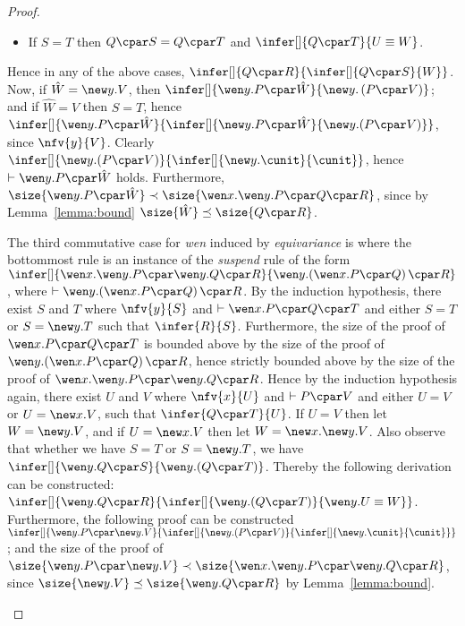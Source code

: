 \begin{proof}
\begin{enumerate}[label=\textbf{\Alph*},ref=\Alph*,leftmargin=*]
{\begin{itemize}
\item If $S = T$ then $Q \cpar S = Q \cpar T$
and $
\infer[]{
Q \cpar T
}{
 U \equiv W
}$.
\end{itemize}
Hence in any of the above cases, $
\infer[]{
Q \cpar R
}{
\infer[]{
 Q \cpar S
}{ W
}}$.
Now, if $\hat{W} = \new y. V$, then $
\infer[]{
\wen y. P \cpar \hat{W}
}{
 \new y. \left(P \cpar V\right)
}$;
and if $\hat{W} = V$ then $S = T$, hence $
\infer[]{
\wen y. P \cpar \hat{W}
}{
\infer[]{
 \new y. P \cpar \hat{W}
}{
 \mathopen{\new y.} \left( P \cpar V\right)
}}$, since $\nfv{y}{V}$.
Clearly $
\infer[]{
\mathopen{\new y.} \left( P \cpar V\right)
}{
\infer[]{
\new y. \cunit
}{
 \cunit
}}
$, hence $\vdash \wen y.P \cpar \hat{W}$ holds.  Furthermore, $\size{\wen y. P \cpar \hat{W}} \prec \size{\wen x. \wen y. P \cpar Q \cpar R}$, since by Lemma~\ref{lemma:bound} $\size{\hat{W}} \preceq \size{ Q \cpar R }$.


The third commutative case for \textit{wen} induced by \textit{equivariance} is where the bottommost rule is an instance of the \textit{suspend} rule of the form 
$
\infer[]{
\wen x. \wen y. P \cpar \wen y. Q \cpar R
}{
\mathopen{\wen y.} \left( \wen x. P \cpar Q \right) \cpar R
}
$, where $\vdash \mathopen{\wen y.} \left( \wen x. P \cpar Q \right) \cpar R$.
By the induction hypothesis, there exist $S$ and $T$ where $\nfv{y}{S}$ and $\vdash \wen x. P \cpar Q \cpar T$ and either $S = T$ or $S = \new y. T$ such that $\infer{R}{S}$.
Furthermore, the size of the proof of $\wen x. P \cpar Q \cpar T$ is bounded above by the size of the proof of $\mathopen{\wen y.} \left( \wen x. P \cpar Q \right) \cpar R$, hence strictly bounded above by the size of the proof of $\wen x. \wen y. P \cpar \wen y. Q \cpar R$.
Hence by the induction hypothesis again, there exist $U$ and $V$ where $\nfv{x}{U}$ and $\vdash P \cpar V$ and either $U = V$ or $U = \new x. V$, such that $\infer{Q \cpar T}{U}$.
If $U = V$ then let $W = \new y. V$, and if $U = \new x. V$ then  let $W = \new x. \new y. V$.
Also observe that whether we have $S = T$ or $S = \new y. T$, we have $
\infer[]{
\wen y. Q \cpar S
}{
\mathopen{\wen y.} \left( Q \cpar T \right)
}$.
Thereby the following derivation can be constructed:
$\infer[]{
\wen y. Q \cpar R
}{
\infer[]{
\mathopen{\wen y.} \left( Q \cpar T \right)
}{
\wen y. U \equiv W
}}$.
Furthermore, the following proof can be constructed $
\infer[]{
\wen y. P \cpar \new y. V
}{
\infer[]{
\mathopen{\new y.} \left( P \cpar V \right)
}{
\infer[]{
\new y. \cunit
}{
\cunit
}}}$;
and the size of the proof of $\size{ \wen y. P \cpar \new y. V } \prec \size{ \wen x. \wen y. P \cpar \wen y. Q \cpar R}$, since $\size{ \new y. V } \preceq \size{ \wen y. Q \cpar R }$ by Lemma~\ref{lemma:bound}.


}
\end{enumerate}
\end{proof}
